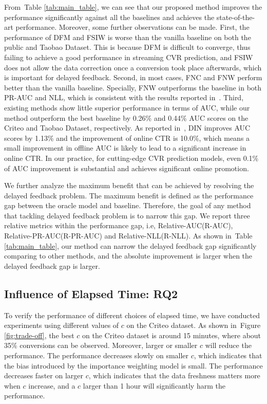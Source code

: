 \documentclass[letterpaper]{article} %
\newcommand{\mtabref}[1]{Table \ref{#1}}
\newcommand{\mfigref}[1]{Figure \ref{#1}}
\newcommand{\mdata}{Taobao Dataset}
\begin{document}
From~\mtabref{tab:main_table}, we can see that our proposed method improves the performance significantly against all the baselines and achieves the state-of-the-art performance. Moreover, some further observations can be made. First, the performance of DFM and FSIW is worse than the vanilla baseline on both the public and \mdata{}. This is because DFM is difficult to converge, thus failing to achieve a good performance in streaming CVR prediction, and FSIW does not allow the data correction once a conversion took place afterwards, which is important for delayed feedback. Second, in most cases, FNC and FNW perform better than the vanilla baseline. Specially, FNW outperforms the baseline in both PR-AUC and NLL, which is consistent with the results reported in~\citet{FNW}. Third, existing methods show little superior performance in terms of AUC, while our method outperform the best baseline by 0.26\% and 0.44\% AUC scores on the Criteo and \mdata{}, respectively. As reported in~\citet{zhou2018deep}, DIN improves AUC scores by 1.13\% and the improvement of online CTR is 10.0\%, which means a small improvement in offline AUC is likely to lead to a significant increase in online CTR. In our practice, for cutting-edge CVR prediction models, even 0.1\% of AUC improvement is substantial and achieves significant online promotion.

We further analyze the maximum benefit that can be achieved by resolving the delayed feedback problem. The maximum benefit is defined as the performance gap between the oracle model and baseline. Therefore, the goal of any method that tackling delayed feedback problem is to narrow this gap. We report three relative metrics within the performance gap, i.e, Relative-AUC(R-AUC), Relative-PR-AUC(R-PR-AUC) and Relative-NLL(R-NLL).
As shown in~\mtabref{tab:main_table}, our method can narrow the delayed feedback gap significantly comparing to other methods, and the absolute improvement is larger when the delayed feedback gap is larger.

\subsection{Influence of Elapsed Time: RQ2}

To verify the performance of different choices of elapsed time, we have conducted experiments using different values of $c$ on the Criteo dataset. As shown in~\mfigref{fig:trade-off}, the best $c$ on the Criteo dataset is around 15 minutes, where about 35\% conversions can be observed. Moreover, larger or smaller $c$ will reduce the performance. The performance decreases slowly on smaller $c$, which indicates that the bias introduced by the importance weighting model is small. The performance decreases faster on larger $c$, which indicates that the data freshness matters more when $c$ increase, and a $c$ larger than 1 hour will significantly harm the performance.
\end{document}
